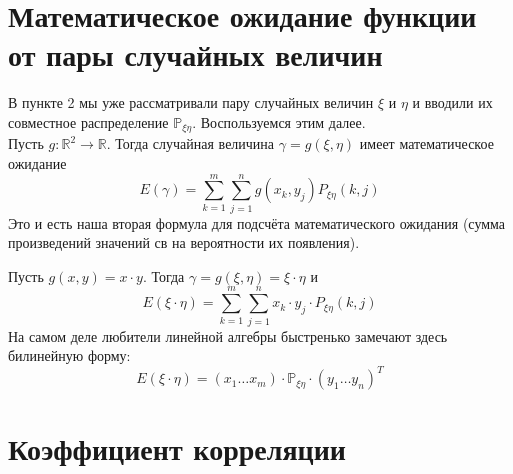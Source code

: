 \documentclass[11pt]{article}
\begin{document}
\section{Математическое ожидание функции от пары случайных величин}

В пункте 2 мы уже рассматривали пару случайных величин $\xi$ и $\eta$ и вводили их совместное распределение $\mathbb{P}_{\xi\eta}$. Воспользуемся этим далее. \\
Пусть $g \colon \mathbb{R}^2 \to \mathbb{R}$. Тогда случайная величина $\gamma = g(\xi, \eta)$ имеет математическое ожидание
\[E(\gamma) = \sum_{k = 1}^{m}\sum_{j = 1}^{n} g(x_k, y_j) P_{\xi\eta}(k, j)\]
Это и есть наша вторая формула для подсчёта математического ожидания (сумма произведений значений св на вероятности их появления). \\
\begin{example}
    Пусть $g(x, y) = x \cdot y$.
    Тогда $\gamma = g(\xi, \eta) = \xi \cdot \eta$ и
    \[E(\xi \cdot \eta) = \sum_{k = 1}^{m}\sum_{j = 1}^{n} x_k \cdot y_j \cdot P_{\xi\eta}(k, j)\]
    На самом деле любители линейной алгебры быстренько замечают здесь билинейную форму:
    \[E(\xi \cdot \eta) = (x_1 \dots x_m) \cdot \mathbb{P}_{\xi\eta} \cdot (y_1 \dots y_n)^T\]
\end{example}

\section{Коэффициент корреляции}
\end{document}
